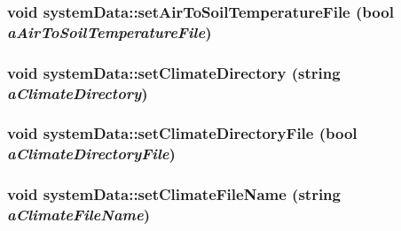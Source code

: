 \hypertarget{classsystem_data_a6044b4807c348caa71defc82c5bc888d}{
\subsubsection[{setAirToSoilTemperatureFile}]{\setlength{\rightskip}{0pt plus 5cm}void systemData::setAirToSoilTemperatureFile (bool {\em aAirToSoilTemperatureFile})}}
\label{classsystem_data_a6044b4807c348caa71defc82c5bc888d}
\hypertarget{classsystem_data_aaac71b9ffa354552b1a52673811e81f9}{
\subsubsection[{setClimateDirectory}]{\setlength{\rightskip}{0pt plus 5cm}void systemData::setClimateDirectory (string {\em aClimateDirectory})}}
\label{classsystem_data_aaac71b9ffa354552b1a52673811e81f9}
\hypertarget{classsystem_data_a86215efe1a7b9503a9f782a93cf70e03}{
\subsubsection[{setClimateDirectoryFile}]{\setlength{\rightskip}{0pt plus 5cm}void systemData::setClimateDirectoryFile (bool {\em aClimateDirectoryFile})}}
\label{classsystem_data_a86215efe1a7b9503a9f782a93cf70e03}
\hypertarget{classsystem_data_a25dd785f92e7e407214d557331296247}{
\subsubsection[{setClimateFileName}]{\setlength{\rightskip}{0pt plus 5cm}void systemData::setClimateFileName (string {\em aClimateFileName})}}
